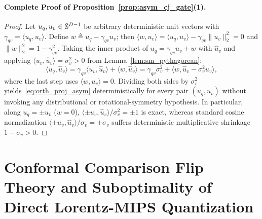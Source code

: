 \paragraph{Complete Proof of Proposition~\ref{prop:asym_cj_gate}(1).}
\begin{proof}
Let $u_q, u_v \in \mathbb{S}^{D-1}$ be arbitrary deterministic unit vectors with $\gamma_{qv} = \langle u_q, u_v\rangle$.
Define $w \triangleq u_q - \gamma_{qv} u_v$; then $\langle w, u_v\rangle = \langle u_q, u_v\rangle - \gamma_{qv}\|u_v\|_2^2 = 0$ and $\|w\|_2^2 = 1 - \gamma_{qv}^2$.
Taking the inner product of $u_q = \gamma_{qv} u_v + w$ with $\hat{u}_v$ and applying $\langle u_v, \hat{u}_v\rangle = \sigma_v^2 > 0$ from Lemma~\ref{lem:sm_pythagorean}:
\begin{equation}
  \langle u_q, \hat{u}_v\rangle
  = \gamma_{qv}\langle u_v, \hat{u}_v\rangle + \langle w, \hat{u}_v\rangle
  = \gamma_{qv}\sigma_v^2 + \langle w, \hat{u}_v - \sigma_v^2 u_v\rangle,
\end{equation}
where the last step uses $\langle w, u_v\rangle = 0$.
Dividing both sides by $\sigma_v^2$ yields~\eqref{eq:orth_proj_asym} deterministically for every pair $(u_q, u_v)$ without invoking any distributional or rotational-symmetry hypothesis.
In particular, along $u_q = \pm u_v$ ($w = 0$), $\langle \pm u_v, \hat{u}_v\rangle / \sigma_v^2 = \pm 1$ is exact, whereas standard cosine normalization $\langle \pm u_v, \hat{u}_v\rangle / \sigma_v = \pm \sigma_v$ suffers deterministic multiplicative shrinkage $1 - \sigma_v > 0$.
\end{proof}

\section{Conformal Comparison Flip Theory and Suboptimality of Direct Lorentz-MIPS Quantization}
\label{app:conformal_flips}

